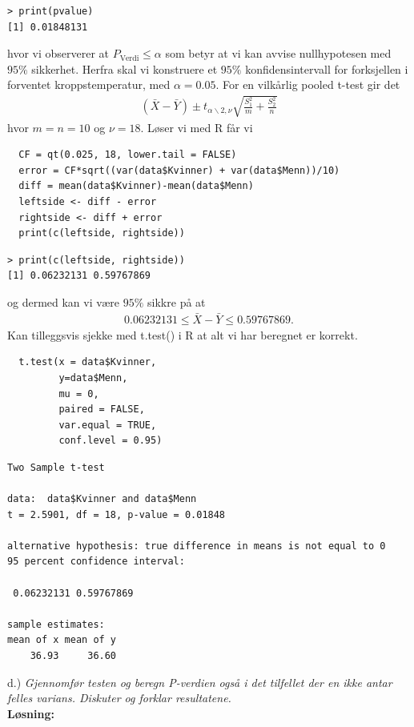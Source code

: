 \documentclass[12pt,
               a4paper,
               article,
               oneside,
               oldfontcommands,
               norsk]{memoir}
\begin{document}
\begin{verbatim}
> print(pvalue)
[1] 0.01848131
\end{verbatim}
hvor vi observerer at $P_{\text{Verdi}} \leq \alpha$ som betyr at vi kan avvise nullhypotesen med $95 \%$ sikkerhet. Herfra skal vi konstruere et $95 \%$ konfidensintervall for forksjellen i forventet kroppstemperatur, med $\alpha = 0.05$. For en vilkårlig pooled t-test gir det 
\begin{align*}
  \left( \bar{X} - \bar{Y} \right) \pm t_{\alpha \backslash 2, \nu} \sqrt{\frac{S_{1}^2}{m} + \frac{S_{2}^2}{n}}
\end{align*}
hvor $m = n = 10$ og $\nu = 18$. Løser vi med R får vi 
\begin{lstlisting}
  CF = qt(0.025, 18, lower.tail = FALSE)
  error = CF*sqrt((var(data$Kvinner) + var(data$Menn))/10)
  diff = mean(data$Kvinner)-mean(data$Menn)
  leftside <- diff - error
  rightside <- diff + error
  print(c(leftside, rightside))
\end{lstlisting}
\begin{verbatim}
> print(c(leftside, rightside))
[1] 0.06232131 0.59767869
\end{verbatim}
og dermed kan vi være $95 \%$ sikkre på at 
\begin{align*}
  0.06232131 \leq \bar{X} - \bar{Y} \leq 0.59767869.
\end{align*}
Kan tilleggsvis sjekke med t.test() i R at alt vi har beregnet er korrekt.
\begin{lstlisting}
  t.test(x = data$Kvinner, 
         y=data$Menn, 
         mu = 0, 
         paired = FALSE, 
         var.equal = TRUE, 
         conf.level = 0.95)
\end{lstlisting}
\begin{verbatim}
Two Sample t-test

data:  data$Kvinner and data$Menn
t = 2.5901, df = 18, p-value = 0.01848

alternative hypothesis: true difference in means is not equal to 0
95 percent confidence interval:

 0.06232131 0.59767869

sample estimates:
mean of x mean of y 
    36.93     36.60 
\end{verbatim}
d.) \emph{Gjennomfør testen og beregn P-verdien også i det tilfellet der en ikke antar felles varians. Diskuter og forklar resultatene.}\vspace{4mm}\\ 
\textbf{Løsning:}\vspace{4mm}\\ 
\end{document}
